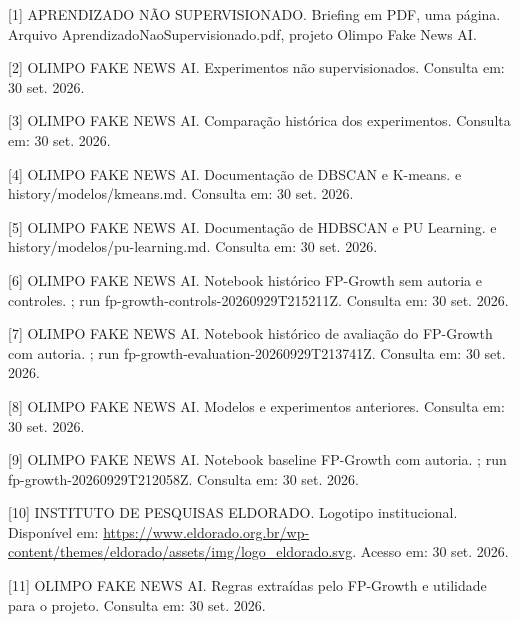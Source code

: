 \documentclass[
  brazilian,
  11pt,
]{article}
\begin{document}
{[}1{]} APRENDIZADO NÃO SUPERVISIONADO. Briefing em PDF, uma página. Arquivo AprendizadoNaoSupervisionado.pdf, projeto Olimpo Fake News AI.

{[}2{]} OLIMPO FAKE NEWS AI. Experimentos não supervisionados.  Consulta em: 30 set. 2026.

{[}3{]} OLIMPO FAKE NEWS AI. Comparação histórica dos experimentos.  Consulta em: 30 set. 2026.

{[}4{]} OLIMPO FAKE NEWS AI. Documentação de DBSCAN e K-means.  e history/modelos/kmeans.md. Consulta em: 30 set. 2026.

{[}5{]} OLIMPO FAKE NEWS AI. Documentação de HDBSCAN e PU Learning.  e history/modelos/pu-learning.md. Consulta em: 30 set. 2026.

{[}6{]} OLIMPO FAKE NEWS AI. Notebook histórico FP-Growth sem autoria e controles. ; run fp-growth-controls-20260929T215211Z. Consulta em: 30 set. 2026.

{[}7{]} OLIMPO FAKE NEWS AI. Notebook histórico de avaliação do FP-Growth com autoria. ; run fp-growth-evaluation-20260929T213741Z. Consulta em: 30 set. 2026.

{[}8{]} OLIMPO FAKE NEWS AI. Modelos e experimentos anteriores.  Consulta em: 30 set. 2026.

{[}9{]} OLIMPO FAKE NEWS AI. Notebook baseline FP-Growth com autoria. ; run fp-growth-20260929T212058Z. Consulta em: 30 set. 2026.

{[}10{]} INSTITUTO DE PESQUISAS ELDORADO. Logotipo institucional. Disponível em: \url{https://www.eldorado.org.br/wp-content/themes/eldorado/assets/img/logo_eldorado.svg}. Acesso em: 30 set. 2026.

{[}11{]} OLIMPO FAKE NEWS AI. Regras extraídas pelo FP-Growth e utilidade para o projeto.  Consulta em: 30 set. 2026.
\end{document}
